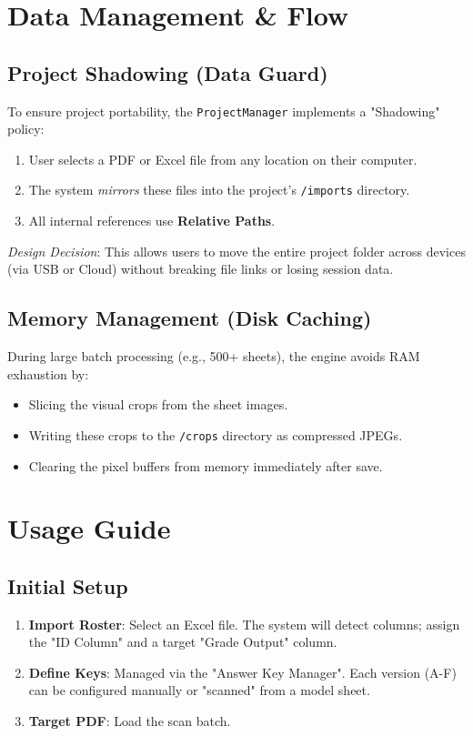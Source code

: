 \documentclass[a4paper,12pt]{article}
\begin{document}
\section{Data Management \& Flow}
\subsection{Project Shadowing (Data Guard)}
To ensure project portability, the \texttt{ProjectManager} implements a "Shadowing" policy:
\begin{enumerate}
    \item User selects a PDF or Excel file from any location on their computer.
    \item The system \textit{mirrors} these files into the project's \texttt{/imports} directory.
    \item All internal references use \textbf{Relative Paths}.
\end{enumerate}
\textit{Design Decision}: This allows users to move the entire project folder across devices (via USB or Cloud) without breaking file links or losing session data.

\subsection{Memory Management (Disk Caching)}
During large batch processing (e.g., 500+ sheets), the engine avoids RAM exhaustion by:
\begin{itemize}
    \item Slicing the visual crops from the sheet images.
    \item Writing these crops to the \texttt{/crops} directory as compressed JPEGs.
    \item Clearing the pixel buffers from memory immediately after save.
\end{itemize}

\section{Usage Guide}
\subsection{Initial Setup}
\begin{enumerate}
    \item \textbf{Import Roster}: Select an Excel file. The system will detect columns; assign the "ID Column" and a target "Grade Output" column.
    \item \textbf{Define Keys}: Managed via the "Answer Key Manager". Each version (A-F) can be configured manually or "scanned" from a model sheet.
    \item \textbf{Target PDF}: Load the scan batch.
\end{enumerate}
\end{document}
